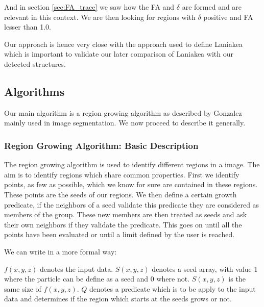 \documentclass[12pt]{article}
\begin{document}
\begin{par}
And in section \ref{sec:FA_trace} we saw how the
 FA and $\delta$ are formed and are relevant in
  this context. 
We are then looking for regions with $\delta$
 positive and FA lesser than 1.0.
\end{par}

\begin{par}
Our approach is hence very close with the approach
 used to define Laniakea
  \cite{tully_laniakea_2014} which is important to
   validate our later comparison of Laniakea with
    our detected structures.
\end{par}

\subsection{Algorithms}

Our main algorithm is a region growing algorithm
 as described by Gonzalez
  \cite{gonzalez_digital_2008} mainly used in
   image segmentation. We now proceed to describe
    it generally.
\subsubsection{Region Growing Algorithm: Basic Description}


\begin{par}
The region growing algorithm is used to identify different regions in a image. The aim is to identify regions which share common properties. First we identify points, as few as possible, which we know for sure are contained in these regions. These points are the seeds of our regions. We then define a certain growth predicate, if the neighbors of a seed validate this predicate they are considered as members of the group. These new members are then treated as seeds and ask their own neighbors if they validate the predicate. This goes on until all the points have been evaluated or until a limit defined by the user is reached.
\end{par}

\begin{par}
We can write in a more formal way:
\end{par}

\begin{par}
$f(x,y,z)$ denotes the input data. $S(x,y,z)$ denotes a seed array, with
value 1 where the particle can be define as a seed and 0 where not. $S(x,y,z)$ is the
same size of $f(x,y,z)$. $Q$ denotes a predicate which is to be apply to the
input data and determines if the region which
 starts at the seeds grows or
not. 
\end{par}
\end{document}
